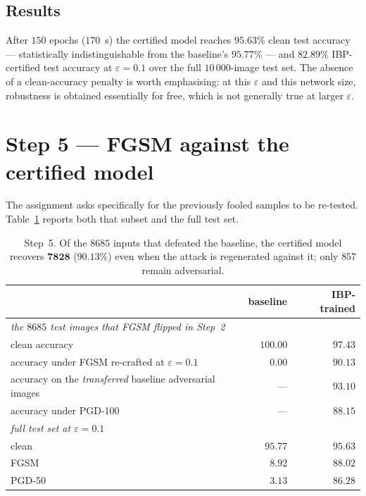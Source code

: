 \documentclass[11pt,a4paper]{article}
\newcommand{\eps}{\varepsilon}
\begin{document}
\subsection{Results}
After $150$ epochs ($170$~s) the certified model reaches
$\mathbf{95.63\%}$ clean test accuracy --- statistically indistinguishable from
the baseline's $95.77\%$ --- and $\mathbf{82.89\%}$ IBP-certified test accuracy
at $\eps=0.1$ over the full $10\,000$-image test set. The absence of a clean-accuracy
penalty is worth emphasising: at this $\eps$ and this network size, robustness
is obtained essentially for free, which is not generally true at larger $\eps$.

\section{Step 5 --- FGSM against the certified model}

The assignment asks specifically for the previously fooled samples to be
re-tested. Table~\ref{tab:step5} reports both that subset and the full test set.

\begin{table}[H]
\centering\small
\begin{tabular}{lrr}
\toprule
& baseline & IBP-trained\\
\midrule
\multicolumn{3}{l}{\emph{the $8685$ test images that FGSM flipped in Step~2}}\\
\quad clean accuracy                       & $100.00$ & $97.43$\\
\quad accuracy under FGSM re-crafted at $\eps=0.1$ & $0.00$ & $\mathbf{90.13}$\\
\quad accuracy on the \emph{transferred} baseline adversarial images & --- & $93.10$\\
\quad accuracy under PGD-100                & --- & $88.15$\\
\midrule
\multicolumn{3}{l}{\emph{full test set at $\eps=0.1$}}\\
\quad clean                                 & $95.77$ & $95.63$\\
\quad FGSM                                  & $8.92$  & $\mathbf{88.02}$\\
\quad PGD-50                                & $3.13$  & $86.28$\\
\bottomrule
\end{tabular}
\caption{Step~5. Of the $8685$ inputs that defeated the baseline, the certified
model recovers $\mathbf{7828}$ ($90.13\%$) even when the attack is regenerated
against it; only $857$ remain adversarial.}
\label{tab:step5}
\end{table}
\end{document}
